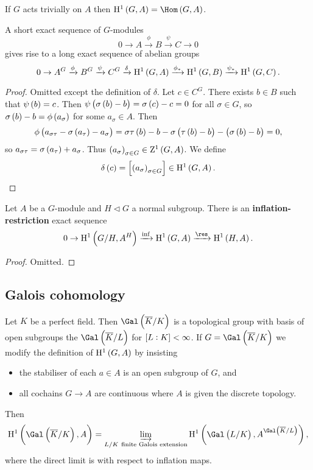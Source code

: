 \begin{remark*}
If $ G $ acts trivially on $ A $ then $ \H^1\br{G, A} = \Hom\br{G, A} $.
\end{remark*}

\begin{theorem}
A short exact sequence of $ G $-modules
$$ 0 \to A \xrightarrow{\phi} B \xrightarrow{\psi} C \to 0 $$
gives rise to a long exact sequence of abelian groups
$$ 0 \to A^G \xrightarrow{\phi} B^G \xrightarrow{\psi} C^G \xrightarrow{\delta} \H^1\br{G, A} \xrightarrow{\phi_*} \H^1\br{G, B} \xrightarrow{\psi_*} \H^1\br{G, C}. $$
\end{theorem}

\begin{proof}
Omitted except the definition of $ \delta $. Let $ c \in C^G $. There exists $ b \in B $ such that $ \psi\br{b} = c $. Then $ \psi\br{\sigma\br{b} - b} = \sigma\br{c} - c = 0 $ for all $ \sigma \in G $, so $ \sigma\br{b} - b = \phi\br{a_\sigma} $ for some $ a_\sigma \in A $. Then
$$ \phi\br{a_{\sigma\tau} - \sigma\br{a_\tau} - a_\sigma} = \sigma\tau\br{b} - b - \sigma\br{\tau\br{b} - b} - \br{\sigma\br{b} - b} = 0, $$
so $ a_{\sigma\tau} = \sigma\br{a_\tau} + a_\sigma $. Thus $ \br{a_\sigma}_{\sigma \in G} \in \Z^1\br{G, A} $. We define
$$ \delta\br{c} = \sbr{\br{a_\sigma}_{\sigma \in G}} \in \H^1\br{G, A}. $$
\end{proof}

\begin{theorem}
Let $ A $ be a $ G $-module and $ H \triangleleft G $ a normal subgroup. There is an \textbf{inflation-restriction} exact sequence
$$ 0 \to \H^1\br{G / H, A^H} \xrightarrow{\inf} \H^1\br{G, A} \xrightarrow{\res} \H^1\br{H, A}. $$
\end{theorem}

\begin{proof}
Omitted.
\end{proof}

\subsection{Galois cohomology}

Let $ K $ be a perfect field. Then $ \Gal\br{\overline{K} / K} $ is a topological group with basis of open subgroups the $ \Gal\br{\overline{K} / L} $ for $ \sbr{L : K} < \infty $. If $ G = \Gal\br{\overline{K} / K} $ we modify the definition of $ \H^1\br{G, A} $ by insisting
\begin{itemize}
\item the stabiliser of each $ a \in A $ is an open subgroup of $ G $, and
\item all cochains $ G \to A $ are continuous where $ A $ is given the discrete topology.
\end{itemize}
Then
$$ \H^1\br{\Gal\br{\overline{K} / K}, A} = \varinjlim_{L / K \ \text{finite Galois extension}} \H^1\br{\Gal\br{L / K}, A^{\Gal\br{\overline{K} / L}}}, $$
where the direct limit is with respect to inflation maps.

